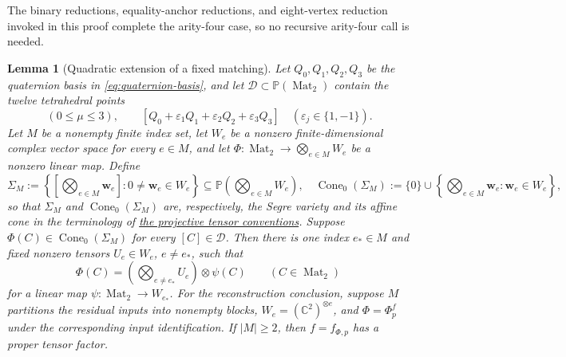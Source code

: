 \documentclass[11pt,letterpaper,onecolumn]{article}
\theoremstyle{plain}
\newtheorem{lemma}[lemma]{Lemma}
\theoremstyle{definition}
\theoremstyle{remark}
\newcommand{\Mat}{\operatorname{Mat}}
\newcommand{\eps}{\varepsilon}
\begin{document}
The binary reductions, equality-anchor reductions, and eight-vertex
reduction invoked in this proof complete the arity-four case, so no
recursive arity-four call is needed.

\begin{lemma}[Quadratic extension of a fixed matching]
\label{lem:platonic-global-ruling}
Let \(Q_0,Q_1,Q_2,Q_3\) be the quaternion basis in
\cref{eq:quaternion-basis}, and let
\(\mathcal D\subset\mathbb P(\Mat_2)\) contain the twelve tetrahedral
points
\begin{equation}
 [Q_\mu]\ (0\le\mu\le3),
 \qquad
 [Q_0+\eps_1Q_1+\eps_2Q_2+\eps_3Q_3]
 \quad(\eps_j\in\{1,-1\}).
 \label{eq:platonic-quadratic-test-set}
\end{equation}
Let \(M\) be a nonempty finite index set, let \(W_e\) be a nonzero
finite-dimensional complex vector space for every \(e\in M\), and let
\(\Phi:\Mat_2\to\bigotimes_{e\in M}W_e\) be a nonzero linear map.  Define
\[
 \Sigma_M:=
 \left\{\left[\bigotimes_{e\in M}{\mathbf{w}}_e\right]:0\ne {\mathbf{w}}_e\in W_e\right\}
 \subseteq\mathbb P\!\left(\bigotimes_{e\in M}W_e\right),
 \quad
 \operatorname{Cone}_0(\Sigma_M):=\{0\}\cup
 \left\{\bigotimes_{e\in M}{\mathbf{w}}_e:{\mathbf{w}}_e\in W_e\right\},
\]
so that \(\Sigma_M\) and \(\operatorname{Cone}_0(\Sigma_M)\) are,
respectively, the Segre variety and its affine cone in the terminology of
\hyperref[subsubsec:projective-tensor-geometry]{the projective tensor conventions}.
Suppose
\(\Phi(C)\in\operatorname{Cone}_0(\Sigma_M)\) for every
\([C]\in\mathcal D\).
Then there is one index \(e_*\in M\) and fixed nonzero tensors
\(U_e\in W_e\), \(e\ne e_*\), such that
\begin{equation}
  \Phi(C)=
  \left(\bigotimes_{e\ne e_*}U_e\right)\otimes\psi(C)
  \qquad(C\in\Mat_2)
  \label{eq:platonic-global-factorization}
\end{equation}
for a linear map \(\psi:\Mat_2\to W_{e_*}\).  For the reconstruction
conclusion, suppose \(M\) partitions the residual inputs into
nonempty blocks, \(W_e=(\mathbb C^2)^{\otimes e}\), and
\(\Phi=\Phi_p^f\) under the corresponding input identification.  If
\(|M|\ge2\), then \(f=f_{\Phi,p}\) has a proper tensor factor.
\end{lemma}
\end{document}
